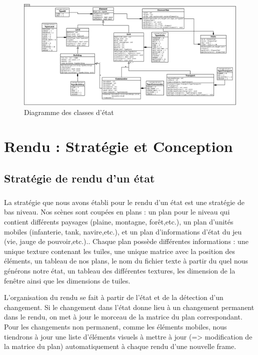 \documentclass[12pt]{report}
\begin{document}
\newpage
\thispagestyle{empty}
\begin{landscape}
\begin{figure}[h]
    \begin{center}
    \includegraphics[scale=0.38]{Status.png}
    \end{center}
    \caption{Diagramme des classes d'état}
\end{figure}
\end{landscape}
    
\newpage

\chapter{Rendu : Stratégie et Conception}
    \section{Stratégie de rendu d'un état}
    \paragraph{}La stratégie que nous avons établi pour le rendu d'un état est une stratégie de bas niveau. Nos scènes sont coupées en plans : un plan pour le niveau qui contient différents paysages (plaine, montagne, forêt,etc.), un plan d'unités mobiles (infanterie, tank, navire,etc.), et un plan d'informations d'état du jeu (vie, jauge de pouvoir,etc.).. Chaque plan possède différentes informations : une unique texture contenant les tuiles, une unique matrice avec la position des éléments, un tableau de nos plans, le nom du fichier texte à partir du quel nous générons notre état, un tableau des différentes textures, les dimension de la fenêtre ainsi que les dimensions de tuiles. 
    
    \paragraphe{}L'organisation du rendu se fait à partir de l'état et de la détection d'un changement. Si le changement dans l’état donne lieu à un changement permanent dans le rendu, on met à jour le morceau de la matrice du plan correspondant. Pour les changements non permanent, comme les éléments mobiles, nous tiendrons à jour une liste d’éléments visuels à mettre à jour (=> modiﬁcation de la matrice du plan) automatiquement à chaque rendu d’une nouvelle frame.  
    
\end{document}

